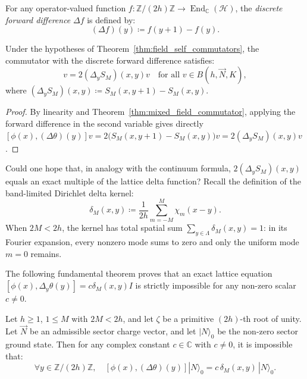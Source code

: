\begin{definition}
For any operator-valued function $f : \mathbb{Z}/(2h)\mathbb{Z} \to \operatorname{End}_{\mathbb{C}}(\mathcal{H})$, the \emph{discrete forward difference} $\Delta f$ is defined by:
\begin{equation}
(\Delta f)(y) \coloneqq f(y + 1) - f(y).
\end{equation}
\end{definition}

\begin{lemma}
\label{lem:mixed_gradient_commutator}
Under the hypotheses of Theorem~\ref{thm:field_self_commutators}, the commutator with the discrete forward difference satisfies:
\begin{equation}
[\phi(x), (\Delta \theta)(y)] v = 2 (\Delta_y S_M)(x, y) v \quad \text{for all } v \in B(h, \vec{N}, K),
\end{equation}
where $(\Delta_y S_M)(x, y) \coloneqq S_M(x, y + 1) - S_M(x, y)$.
\end{lemma}

\begin{proof}
By linearity and Theorem~\ref{thm:mixed_field_commutator}, applying the forward difference in the second variable gives directly $[\phi(x), (\Delta\theta)(y)]v=2\bigl(S_M(x,y+1)-S_M(x,y)\bigr)v=2(\Delta_y S_M)(x,y)v$.
\end{proof}

Could one hope that, in analogy with the continuum formula, $2 (\Delta_y S_M)(x, y)$ equals an exact multiple of the lattice delta function? Recall the definition of the band-limited Dirichlet delta kernel:
\begin{equation}
\delta_M(x, y) \coloneqq \frac{1}{2h} \sum_{m = -M}^M \chi_m(x - y).
\end{equation}
When $2M < 2h$, the kernel has total spatial sum $\sum_{y \in \Lambda} \delta_M(x, y) = 1$: in its Fourier expansion, every nonzero mode sums to zero and only the uniform mode $m=0$ remains.

The following fundamental theorem proves that an exact lattice equation $[\phi(x), \Delta_y \theta(y)] = c \delta_M(x, y) I$ is strictly impossible for any non-zero scalar $c \neq 0$.

\begin{theorem}
\label{thm:zero_mode_obstruction}
Let $h \ge 1$, $1 \le M$ with $2M < 2h$, and let $\zeta$ be a primitive $(2h)$-th root of unity. Let $\vec{N}$ be an admissible sector charge vector, and let $|N\rangle_0$ be the non-zero sector ground state. Then for any complex constant $c \in \mathbb{C}$ with $c \neq 0$, it is impossible that:
\begin{equation}
\forall y \in \mathbb{Z}/(2h)\mathbb{Z}, \quad [\phi(x), (\Delta \theta)(y)] |N\rangle_0 = c\, \delta_M(x, y)\, |N\rangle_0.
\end{equation}
\end{theorem}

